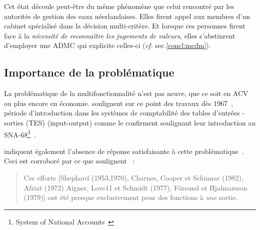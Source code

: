 Cet état découle peut-être du même phénomène que celui rencontré par les autorités de gestion des eaux néerlandaises.
Elles firent appel aux membres d'un cabinet spécialisé dans la décision multi-critère.
Et lorsque ces personnes firent face à la \emph{nécessité de reconnaître les jugements de valeurs}, elles s’abstinrent d'employer une \gls{ADMC} qui explicite celles-ci (\textit{cf.} sec.\ref{concl:mcdm}).

\subsection{Importance de la problématique}

La problématique de la multifonctionnalité n'est pas neuve, que ce soit en ACV ou plus encore en économie.
%
%
\citeauthor{heijungs_special_1998} soulignent sur ce point des travaux dès 1967~\cite{heijungs_special_1998}, période d'introduction dans les systèmes de comptabilité des tables d'entrées - sorties (TES) (input-output) comme le confirment \citeauthor{majeau-bettez_unified_2014} soulignant leur introduction au SNA-68\footnote{System of National Accounts~\cite{nations_unies_system_1968}}~\cite{majeau-bettez_unified_2014}.

\citeauthor{heijungs_special_1998} indiquent également l'absence de réponse satisfaisante à cette problématique~\cite{heijungs_special_1998}.
Ceci est corroboré par ce que soulignent \citeauthor{charnes_foundations_1985}~:
\blockcquote[synthèse et traduction]{charnes_foundations_1985}{
Ces efforts [Shephard (1953,1970), Charnes, Cooper et Schinnar (1982), Afriat (1972) Aigner, Love11 et Schmidt (1977), Försund et Hjalmarsson (1979)]
ont été presque exclusivement pour des fonctions à \emph{une} sortie.
}

